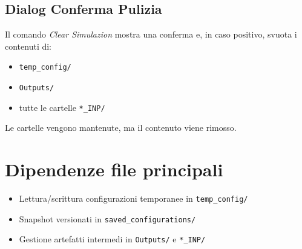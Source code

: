 \subsection{Dialog Conferma Pulizia}
Il comando \emph{Clear Simulazion} mostra una conferma e, in caso positivo, svuota i contenuti di:
\begin{itemize}[leftmargin=1.5em]
  \item \texttt{temp\_config/}
  \item \texttt{Outputs/}
  \item tutte le cartelle \texttt{*\_INP/}
\end{itemize}
Le cartelle vengono mantenute, ma il contenuto viene rimosso.

\section{Dipendenze file principali}
\begin{itemize}[leftmargin=1.5em]
  \item Lettura/scrittura configurazioni temporanee in \texttt{temp\_config/}
  \item Snapshot versionati in \texttt{saved\_configurations/}
  \item Gestione artefatti intermedi in \texttt{Outputs/} e \texttt{*\_INP/}
\end{itemize}
